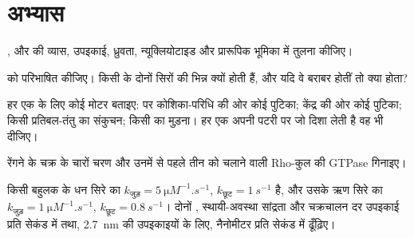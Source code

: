 \section{अभ्यास}

\begin{exercise}[$\star$]\label{exo:b3:cytoskeleton-motility:1}
,  और  की व्यास, उपइकाई,
ध्रुवता, न्यूक्लियोटाइड और प्रारूपिक भूमिका में तुलना कीजिए।
\end{exercise}

\begin{exercise}[$\star$]\label{exo:b3:cytoskeleton-motility:2}
 को परिभाषित कीजिए। किसी  के दोनों सिरों
की  भिन्न क्यों होती हैं, और यदि वे बराबर होतीं तो
क्या होता?
\end{exercise}

\begin{exercise}[$\star$]\label{exo:b3:cytoskeleton-motility:3}
हर एक के लिए कोई मोटर बताइए:  पर कोशिका-परिधि की ओर कोई
पुटिका; केंद्र की ओर कोई पुटिका; किसी प्रतिबल-तंतु का संकुचन; किसी
 का मुड़ना। हर एक अपनी पटरी पर जो दिशा लेती है वह भी दीजिए।
\end{exercise}

\begin{exercise}[$\star$]\label{exo:b3:cytoskeleton-motility:4}
रेंगने के चक्र के चारों चरण और उनमें से पहले तीन को चलाने वाली
Rho-कुल की GTPase गिनाइए।
\end{exercise}

\begin{exercise}[$\star\star$]\label{exo:b3:cytoskeleton-motility:5}
किसी बहुलक के धन सिरे का $k_{\text{जुड़}} = \qty{5}{\micro M^{-1}.s^{-1}}$,
$k_{\text{छूट}} = \qty{1}{s^{-1}}$ है, और उसके ऋण सिरे का $k_{\text{जुड़}} =
\qty{1}{\micro M^{-1}.s^{-1}}$, $k_{\text{छूट}} = \qty{0.8}{s^{-1}}$।
दोनों , स्थायी-अवस्था सांद्रता और चक्रचालन दर
उपइकाई प्रति सेकंड में तथा, \qty{2.7}{nm} की उपइकाइयों के लिए,
नैनोमीटर प्रति सेकंड में ढूँढ़िए।
\end{exercise}

